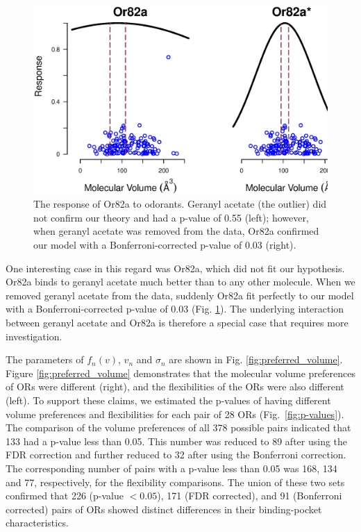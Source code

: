 \documentclass[fleqn,11pt]{wlscirep}
\newcommand{\numberofreceptors}{ 28 }
\begin{document}
\begin{figure}
	\centering
	\includegraphics[width= 0.75 \textwidth]{vol-res-Or82a.eps}
	\caption{The response of Or82a to odorants. Geranyl acetate (the outlier) did not confirm our theory and had a p-value of 0.55 (left); however, 
	when geranyl acetate was removed from the data, 
	Or82a confirmed our model with a Bonferroni-corrected p-value of 0.03 (right).}
	\label{fig:Or82a}
\end{figure}
One interesting case in this regard was Or82a, which did not fit our hypothesis. 
Or82a binds to geranyl acetate much better than to any other molecule. 
When we removed geranyl acetate from the data, 
suddenly Or82a fit perfectly to our model with a Bonferroni-corrected p-value of 0.03 (Fig. \ref{fig:Or82a}). 
The underlying interaction between geranyl acetate and Or82a is therefore 
a special case that requires more investigation.

The parameters of $f_n(v)$, $v_n$ and $\sigma_n$ are shown in Fig. \ref{fig:preferred_volume}.
Figure \ref{fig:preferred_volume} demonstrates that the molecular volume preferences of ORs were different (right), 
and the flexibilities of the ORs were also different (left).
To support these claims, 
we estimated the p-values of having different volume preferences and flexibilities for each pair of \numberofreceptors ORs
(Fig.~\ref{fig:p-values}). 
The comparison of the volume preferences of all 378 possible pairs indicated that
133 had a p-value less than 0.05. 
This number was reduced to 89 after using the FDR correction and further reduced to 32 after using the Bonferroni correction.
The corresponding number of pairs with a p-value less than 0.05 was 168, 134 and 77, respectively, for the flexibility comparisons. 
The union of these two sets confirmed that 226 (p-value $<0.05$), 171 (FDR corrected), and 91 (Bonferroni corrected) pairs of ORs showed distinct differences in their binding-pocket characteristics.
\end{document}
